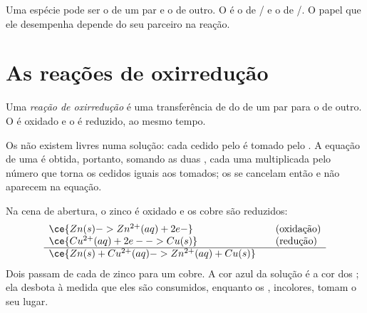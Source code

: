 \begin{remark}\label{rem:g11:redox:amphoteric}
Uma espécie pode ser o  de um par e o  de outro. O 
 é o  de / e o  de
/. O papel que ele desempenha depende do seu
parceiro na reação.
\end{remark}

\section{As reações de oxirredução}

\begin{definition}\label{def:g11:redox:reaction}
Uma \emph{reação de oxirredução} é uma
transferência de  do  de um par para o  de outro.
O  é oxidado e o  é reduzido, ao mesmo tempo.
\end{definition}

\begin{proposition}\label{prop:g11:redox:no-free-electrons}
Os  não existem livres numa solução: cada  cedido pelo
 é tomado pelo . A equação de uma  é
obtida, portanto, somando as duas , cada uma multiplicada
pelo número que torna os  cedidos iguais aos  tomados;
os  se cancelam então e não aparecem na equação.
\end{proposition}

\begin{example}\label{ex:g11:redox:zinc-copper}
Na cena de abertura, o zinco é oxidado e os  cobre são reduzidos:
\[
\begin{array}{l@{\qquad}l}
  \ce{Zn(s) -> Zn^{2+}(aq) + 2e-} & \text{(oxidação)}\\
  \ce{Cu^{2+}(aq) + 2e- -> Cu(s)} & \text{(redução)}\\
  \hline
  \ce{Zn(s) + Cu^{2+}(aq) -> Zn^{2+}(aq) + Cu(s)} &
\end{array}
\]
Dois  passam de cada  de zinco para um  cobre. A cor azul
da solução é a cor dos  ; ela desbota à medida que eles
são consumidos, enquanto os  , incolores, tomam o seu
lugar.
\end{example}


